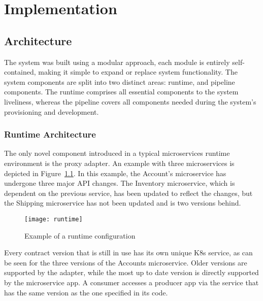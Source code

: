 
%

\chapter{Implementation}
\label{cha:implementation}

\section{Architecture} %
\label{sec:architecture}
The system was built using a modular approach,
each module is entirely self-contained, making it simple to expand or replace system functionality.
The system components are split into two distinct areas: runtime, and pipeline components.
The runtime comprises all essential components to the system liveliness,
whereas the pipeline covers all components needed during the system's provisioning and development.

\subsection{Runtime Architecture} %
\label{sec:runtime_architecture}

The only novel component introduced in a typical microservices runtime environment is the proxy adapter.
An example with three microservices is depicted in Figure~\ref{fig:runtime}.
In this example, the Account's microservice has undergone three major API changes.
The Inventory microservice, which is dependent on the previous service, has been updated to reflect the changes, but the Shipping microservice has not been updated and is two versions behind.

\begin{figure}[htbp]
    \centering
    \texttt{[image: runtime]}
    \caption{Example of a runtime configuration}
    \label{fig:runtime}
\end{figure}

Every contract version that is still in use has its own unique K8s service, as can be seen for the three versions of the Accounts microservice.
Older versions are supported by the adapter, while the most up to date version is directly supported by the microservice app.
A consumer accesses a producer app via the service that has the same version as the one specified in its code.

